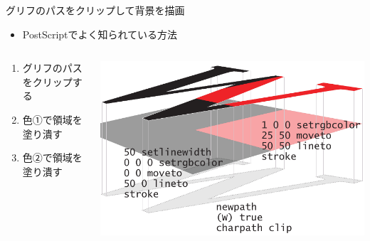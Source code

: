 \documentclass[unicode,14pt]{beamer}
\begin{document}
\begin{frame}[t]{グリフのパスをクリップして背景を描画}
  \sffamily
  \begin{itemize}
  \item PostScriptでよく知られている方法
  \end{itemize}
  \begin{columns}[t]
    \begin{column}{.35\textwidth}
  \begin{enumerate}
\item グリフのパスをクリップする
\item 色①で領域を塗り潰す
\item 色②で領域を塗り潰す
  \end{enumerate}
    \end{column}
    \begin{column}{.6\textwidth}
  \begin{center}
    \includegraphics[width=\textwidth]{figures/w-clip-ps.pdf}
    \vfill
  \end{center}
    \end{column}
  \end{columns}
\end{frame}
\end{document}
